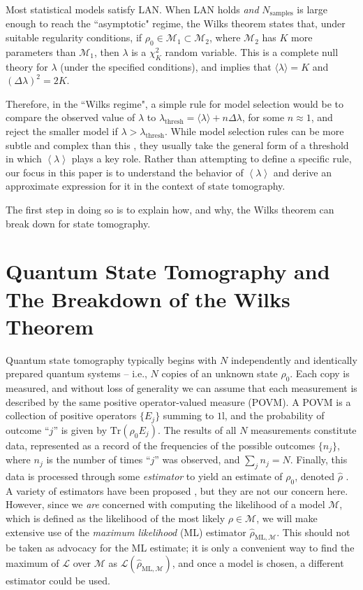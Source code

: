 \documentclass[aps,pra, twocolumn]{revtex4-1}
\newcommand{\M}{\mathcal{M}}
\newcommand{\Tr}{\mathrm{Tr}}
\newcommand{\cL}{\mathcal{L}}
\newcommand{\Id}{\mathbb{I}}
\newcommand{\expect}[1]{\ensuremath{\left\langle#1\right\rangle}}
\def\Id{1\!\mathrm{l}}
\newcommand{\rhohat}{\hat{\rho}}
\newcommand{\rhoML}[1]{\rhohat_{\scriptscriptstyle{\mathrm{ML},#1}}}
\begin{document}
Most statistical models satisfy LAN.  When LAN holds \emph{and} $N_{\mathrm{samples}}$ is large enough to reach the ``asymptotic" regime, the Wilks theorem states that, under suitable regularity conditions, if $\rho_{0}\in \M_{1}\subset \M_{2}$, where $\M_{2}$ has $K$ more parameters than $\M_{1}$, then $\lambda$ is a $\chi^{2}_{K}$ random variable.  This is a complete null theory for $\lambda$ (under the specified conditions), and implies that $\langle \lambda \rangle = K$ and $(\Delta \lambda)^{2} = 2K$.

Therefore, in the ``Wilks regime", a simple rule for model selection would be to compare the observed value of $\lambda$ to $\lambda_{\mathrm{thresh}} = \langle \lambda \rangle + n\Delta \lambda$, for some $n \approx 1$, and reject the smaller model if $\lambda > \lambda_{\mathrm{thresh}}$.  While model selection rules can be more subtle and complex than this \cite{Akaike1974, Schwarz1978, Kass1995, Spiegelhalter2002}, they usually take the general form of a threshold in which $\expect{\lambda}$ plays a key role.  Rather than attempting to define a specific rule, our focus in this paper is to understand the behavior of $\expect{\lambda}$ and derive an approximate expression for it in the context of state tomography.

The first step in doing so is to explain how, and why, the Wilks theorem can break down for state tomography.

\section{Quantum State Tomography and The Breakdown of the Wilks Theorem}
\label{sec:qstmodelselection}
Quantum state tomography typically begins with $N$ independently and identically prepared quantum systems -- i.e., $N$ copies of an unknown state $\rho_{0}$.  Each copy is measured, and without loss of generality we can assume that each measurement is described by the same positive operator-valued measure (POVM).  A POVM is a collection of positive operators $\{E_j\}$ summing to $\Id$, and the probability of outcome ``$j$'' is given by $\Tr(\rho_0 E_j)$.  The results of all $N$ measurements constitute data, represented as a record of the frequencies of the possible outcomes $\{n_{j}\}$, where $n_{j}$ is the number of times ``$j$'' was observed, and $\sum_{j}n_{j} = N$.  Finally, this data is processed through some \emph{estimator} to yield an estimate of $\rho_0$, denoted $\hat{\rho}$ .  A variety of estimators have been proposed \cite{Vogel1989,Hradil1997,JamesPRA2001,Blume-Kohout2010b,Blume-Kohout2010,Zhu2014a,Ferrie2016}, but they are not our concern here.  However, since we \emph{are} concerned with computing the likelihood of a model $\M$, which is defined as the likelihood of the most likely $\rho\in\M$, we will make extensive use of the \emph{maximum likelihood} (ML) estimator $\rhoML{\M}$.  This should not be taken as advocacy for the ML estimate; it is only a convenient way to find the maximum of $\cL$ over $\M$ as $\mathcal{L}(\rhoML{\M})$, and once a model is chosen, a different estimator could be used.
\end{document}
